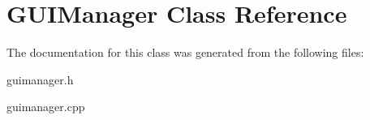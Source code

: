 \hypertarget{classGUIManager}{\section{G\+U\+I\+Manager Class Reference}
\label{classGUIManager}
}


The documentation for this class was generated from the following files\+:\begin{DoxyCompactItemize}
\item 
guimanager.\+h\item 
guimanager.\+cpp\end{DoxyCompactItemize}
